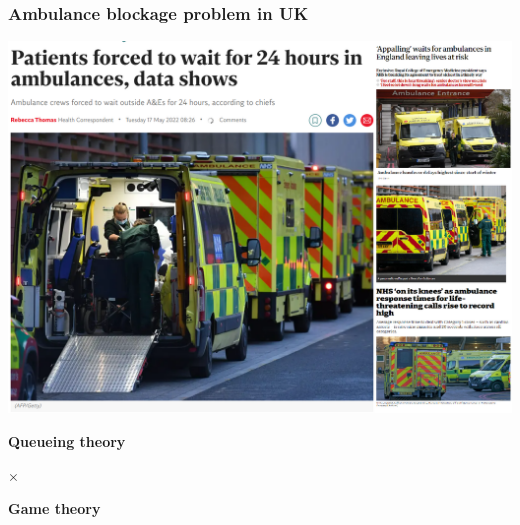 \begin{frame}
    \frametitle{Ambulance blockage problem in UK}
    \centering

    \includegraphics[scale=0.3]{Bin/ambulance_pics/articles.PNG}
        
\end{frame}



\begin{frame}
    \Huge
    \centering

    \textbf{Queueing theory}

    \(\times\)

    \textbf{Game theory}
    
\end{frame}

